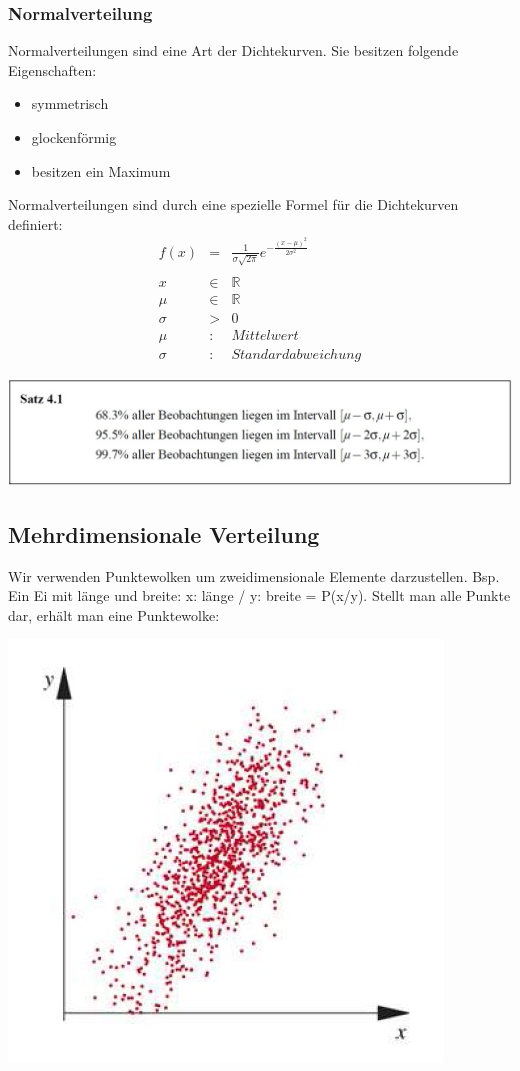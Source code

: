 \documentclass[12pt,a4paper]{article} %
\begin{document}
\subsubsection{Normalverteilung}
Normalverteilungen sind eine Art der Dichtekurven. Sie besitzen folgende Eigenschaften:
\begin{itemize}
\item symmetrisch
\item glockenförmig
\item besitzen ein Maximum
\end{itemize}
Normalverteilungen sind durch eine spezielle Formel für die Dichtekurven definiert:
\begin{eqnarray*}
f(x) &=& \frac{1}{\sigma \sqrt{2\pi}}e^{-\frac{(x-\mu)^2}{2\sigma ^2}}\\\\
x &\in & \mathbb{R}\\
\mu &\in & \mathbb{R}\\
\sigma &>& 0\\
\mu &:& Mittelwert\\
\sigma &:& Standardabweichung
\end{eqnarray*}

\begin{center}
\includegraphics[scale=0.5]{bedNormalverteilung.jpg}
\end{center}


\subsection{Mehrdimensionale Verteilung}
Wir verwenden Punktewolken um zweidimensionale Elemente darzustellen. Bsp. Ein Ei mit länge und breite: x: länge / y: breite = P(x/y). Stellt man alle Punkte dar, erhält man eine Punktewolke:
\begin{center}
\includegraphics[scale=0.8]{punktewolke.jpg}
\end{center}
\end{document}
